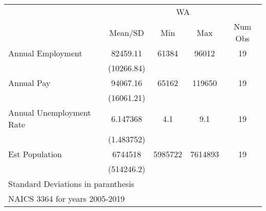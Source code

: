 {
\def\sym#1{\ifmmode^{#1}\else\(^{#1}\)\fi}
\begin{tabular}{l*{1}{cccc}}
\hline\hline
            &\multicolumn{4}{c}{WA}                             \\
            &     Mean/SD&         Min&         Max&     Num Obs\\
\hline
Annual Employment&    82459.11&       61384&       96012&          19\\
            &  (10266.84)&            &            &            \\
Annual Pay  &    94067.16&       65162&      119650&          19\\
            &  (16061.21)&            &            &            \\
Annual Unemployment Rate&    6.147368&         4.1&         9.1&          19\\
            &  (1.483752)&            &            &            \\
Est Population&     6744518&     5985722&     7614893&          19\\
            &  (514246.2)&            &            &            \\
\hline\hline
\multicolumn{5}{l}{\footnotesize Standard Deviations in paranthesis}\\
\multicolumn{5}{l}{\footnotesize NAICS 3364 for years 2005-2019}\\
\end{tabular}
}
